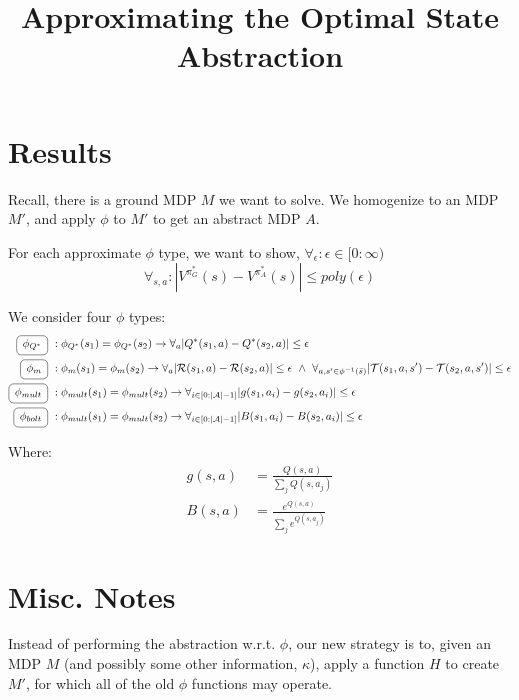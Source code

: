 \documentclass[11pt]{amsart}
\title{Approximating the Optimal State Abstraction}
\author{}
\date{}                                           %
\begin{document}
\maketitle
\section{Results}

Recall, there is a ground MDP $M$ we want to solve. We homogenize to an MDP $M'$, and apply $\phi$ to $M'$ to get an abstract MDP $A$.

For each approximate $\phi$ type, we want to show, $\forall_{\epsilon} : \epsilon \in [0 : \infty)$
\begin{equation}
\forall_{s,a} : | V^{\pi^*_G}(s) - V^{\pi^*_{A}}(s) | \leq poly(\epsilon)
\end{equation}

We consider four $\phi$ types:
\begin{align*}
\encircle{\text{ $\phi_{Q^*}$ }}\ & : \phi_{Q^*}(s_1) = \phi_{Q^*}(s_2) \rightarrow \forall_a |Q^*(s_1,a) - Q^*(s_2,a)| \leq \epsilon \\
\encircle{\text{ $\phi_m$ }}\ & : \phi_{m}(s_1) = \phi_m(s_2) \rightarrow \forall_a |\mathcal{R}(s_1,a) - \mathcal{R}(s_2,a)| \leq \epsilon \ \wedge\ 
\forall_{a,s' \in \phi^{-1}(\bar{s})} | \mathcal{T}(s_1,a,s') - \mathcal{T}(s_2,a,s') | \leq \epsilon \\
\encircle{\text{ $\phi_{mult}$ }}\ & : \phi_{mult}(s_1) = \phi_{mult}(s_2) \rightarrow \forall_{i \in [0:|\mathcal{A}| - 1]} | g(s_1, a_i) - g(s_2, a_i) | \leq \epsilon \\
\encircle{\text{ $\phi_{bolt}$ }}\ & : \phi_{mult}(s_1) = \phi_{mult}(s_2) \rightarrow \forall_{i \in [0:|\mathcal{A}| - 1]} | B(s_1, a_i) - B(s_2, a_i) | \leq \epsilon
\end{align*}

Where:
\begin{align}
g(s,a) &= \frac{Q(s,a)}{\sum_j Q(s,a_j)} \\
B(s,a) &= \frac{e^{Q(s,a)}}{\sum_j e^{Q(s,a_j)}}
\end{align}


\newpage
\section{Misc. Notes}
 Instead of performing the abstraction w.r.t. $\phi$, our new strategy is to, given an MDP $M$ (and possibly some other information, $\kappa$), apply a function $H$ to create $M'$, for which all of the old $\phi$ functions may operate.
\end{document}
